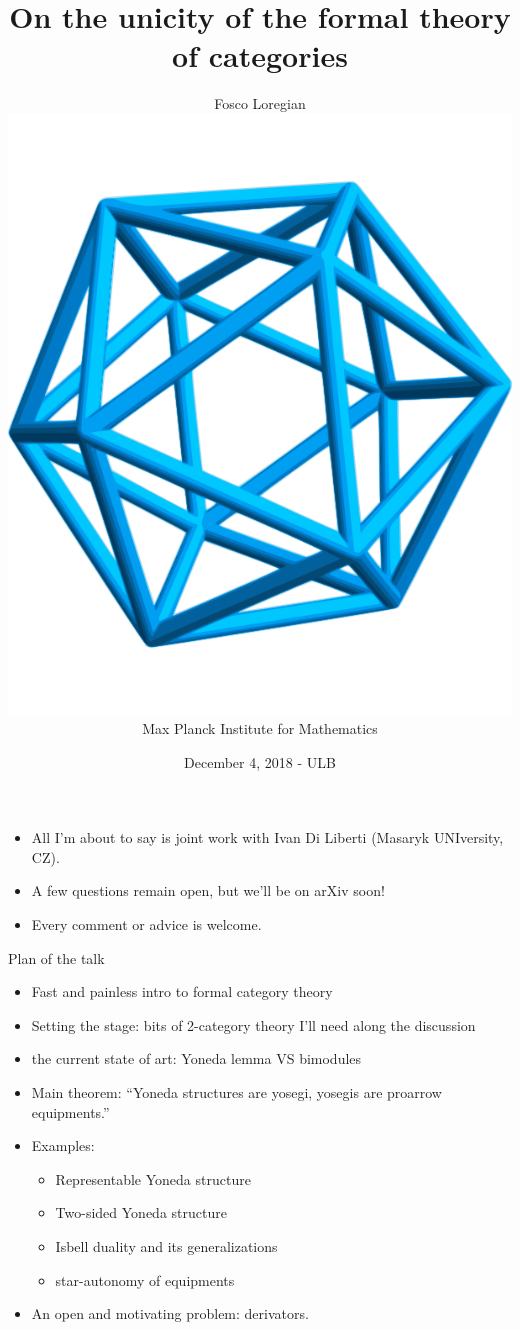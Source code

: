 \documentclass{beamer}
\author[Fosco Loregian]{Fosco Loregian \\ \includegraphics[scale=.05]{MPIM.png} \\ Max Planck Institute for Mathematics}
\title[Unicity]{On the unicity of the formal theory of categories}
\date{December 4, 2018 - ULB}
\begin{document}
\begin{frame}
	\maketitle
\end{frame}

\begin{frame}
	\begin{itemize}
		\item<1-> All I'm about to say is joint work with \alert{Ivan Di Liberti} (Masaryk UNIversity, CZ).
		\item<2-> A few questions remain open, but we'll be on arXiv soon!
		\item<3-> Every comment or advice is welcome.
	\end{itemize}
\end{frame}

\begin{frame}{Plan of the talk}
	\begin{itemize}
		\item<1-> Fast and painless intro to formal category theory
		\item<2-> Setting the stage: bits of 2-category theory I'll need along the discussion
		\item<3-> the current state of art: Yoneda lemma VS bimodules
		\item<4-> \alert{Main theorem}: ``Yoneda structures are yosegi, yosegis are proarrow equipments.''
		\item<5-> Examples:
		      \begin{itemize}
			      \item Representable Yoneda structure
			      \item Two-sided Yoneda structure
			      \item Isbell duality and its generalizations
			      \item star-autonomy of equipments
		      \end{itemize}
		\item<6-> An open and motivating problem: derivators.
	\end{itemize}
\end{frame}
\end{document}
